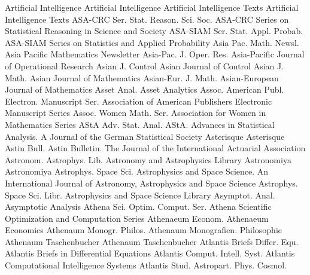 {Artificial Intelligence}
{Artificial Intelligence}
{Artificial Intelligence Texts}
{Artificial Intelligence Texts}
{ASA-CRC Ser. Stat. Reason. Sci. Soc.}
{ASA-CRC Series on Statistical Reasoning in Science and Society}
{ASA-SIAM Ser. Stat. Appl. Probab.}
{ASA-SIAM Series on Statistics and Applied Probability}
{Asia Pac. Math. Newsl.}
{Asia Pacific Mathematics Newsletter}
{Asia-Pac. J. Oper. Res.}
{Asia-Pacific Journal of Operational Research}
{Asian J. Control}
{Asian Journal of Control}
{Asian J. Math.}
{Asian Journal of Mathematics}
{Asian-Eur. J. Math.}
{Asian-European Journal of Mathematics}
{Asset Anal.}
{Asset Analytics}
{Assoc. American Publ. Electron. Manuscript Ser.}
{Association of American Publishers Electronic Manuscript Series}
{Assoc. Women Math. Ser.}
{Association for Women in Mathematics Series}
{AStA Adv. Stat. Anal.}
{AStA. Advances in Statistical Analysis. A Journal of the German Statistical Society}
{Asterisque}
{Asterisque}
{Astin Bull.}
{Astin Bulletin. The Journal of the International Actuarial Association}
{Astronom. Astrophys. Lib.}
{Astronomy and Astrophysics Library}
{Astronomiya}
{Astronomiya}
{Astrophys. Space Sci.}
{Astrophysics and Space Science. An International Journal of Astronomy, Astrophysics and Space Science}
{Astrophys. Space Sci. Libr.}
{Astrophysics and Space Science Library}
{Asymptot. Anal.}
{Asymptotic Analysis}
{Athena Sci. Optim. Comput. Ser.}
{Athena Scientific Optimization and Computation Series}
{Athenaeum Econom.}
{Athenaeum Economics}
{Athenaum Monogr. Philos.}
{Athenaum Monografien. Philosophie}
{Athenaum Taschenbucher}
{Athenaum Taschenbucher}
{Atlantis Briefs Differ. Equ.}
{Atlantis Briefs in Differential Equations}
{Atlantis Comput. Intell. Syst.}
{Atlantis Computational Intelligence Systems}
{Atlantis Stud. Astropart. Phys. Cosmol.}
